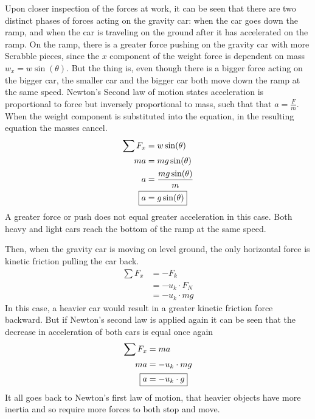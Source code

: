 \documentclass[12pt]{article}
\begin{document}
Upon closer inspection of the forces at work, it can be seen that there are two distinct phases of forces acting on the gravity car: when the car goes down the ramp, and when the car is traveling on the ground after it has accelerated on the ramp. On the ramp, there is a greater force pushing on the gravity car with more Scrabble pieces, since the \(x\) component of the weight force is dependent on mass \(w_x = w\sin(\theta)\). But the thing is, even though there is a bigger force acting on the bigger car, the smaller car and the bigger car both move down the ramp at the same speed. Newton's Second law of motion states acceleration is proportional to force but inversely proportional to mass, such that that \(a=\frac{F}{m}\). When the weight component is substituted into the equation, in the resulting equation the masses cancel.
\begin{align*}
	\sum F_x  & = w\sin(\theta)            \\
	ma        & = mg\sin(\theta)           \\
	a         & = \frac{mg\sin(\theta)}{m} \\
	\Aboxed{a & =g\sin(\theta)}
\end{align*}
A greater force or push does not equal greater acceleration in this case. Both heavy and light cars reach the bottom of the ramp at the same speed.

Then, when the gravity car is moving on level ground, the only horizontal force is kinetic friction pulling the car back.
\begin{align*}
	\sum F_{x} & =-F_{k}            \\
	           & =-u_{k}\cdot F_{N} \\
	           & =-u_{k}\cdot mg
\end{align*}
In this case, a heavier car would result in a greater kinetic friction force backward. But if Newton's second law is applied again it can be seen that the decrease in acceleration of both cars is equal once again
\begin{align*}
	\sum F_{x} & =ma             \\
	ma         & =-u_{k}\cdot mg \\
	\Aboxed{a  & =-u_{k}\cdot g}
\end{align*}
It all goes back to Newton's first law of motion, that heavier objects have more inertia and so require more forces to both stop and move.
\end{document}
